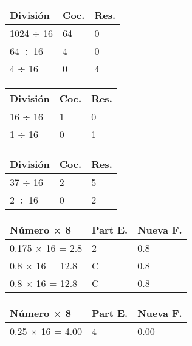 \documentclass[12pt]{article}
\begin{document}
\begin{table}[H]
\centering
\begin{minipage}[t]{0.32\textwidth}
\centering
\begin{tabular}{lll}
\toprule
\textbf{División} & \textbf{Coc.} & \textbf{Res.} \\
\midrule
1024 ÷ 16 & 64 & 0 \\
64 ÷ 16 & 4 & 0 \\
4 ÷ 16 & 0 & 4 \\
\bottomrule
\end{tabular}
\end{minipage}
\hfill
\begin{minipage}[t]{0.32\textwidth}
\centering
\begin{tabular}{lll}
\toprule
\textbf{División} & \textbf{Coc.} & \textbf{Res.} \\
\midrule
16 ÷ 16 & 1 & 0 \\
1 ÷ 16 & 0 & 1 \\
\bottomrule
\end{tabular}
\end{minipage}
\hfill
\begin{minipage}[t]{0.32\textwidth}
\centering
\begin{tabular}{lll}
\toprule
\textbf{División} & \textbf{Coc.} & \textbf{Res.} \\
\midrule
37 ÷ 16 & 2 & 5 \\
2 ÷ 16 & 0 & 2 \\
\bottomrule
\end{tabular}
\end{minipage}
\end{table}
	

\begin{table}[H]
\centering
\begin{minipage}[t]{0.48\textwidth}
\centering
\begin{tabular}{lll}
\toprule
\textbf{Número × 8} & \textbf{Part E.} & \textbf{Nueva F.} \\
\midrule
0.175 × 16 = 2.8 & 2 & 0.8 \\
0.8 × 16 = 12.8 & C & 0.8 \\
0.8 × 16 = 12.8 & C & 0.8 \\
\bottomrule
\end{tabular}
\end{minipage}
\hfill
\begin{minipage}[t]{0.48\textwidth}
\centering
\begin{tabular}{lll}
\midrule
\textbf{Número × 8} & \textbf{Part E.} & \textbf{Nueva F.} \\
\midrule
0.25 × 16 = 4.00 & 4 & 0.00 \\
\bottomrule
\end{tabular}
\end{minipage}
\end{table}
\end{document}

